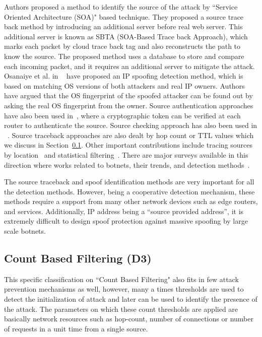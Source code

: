 \documentclass[final,5p,times,twocolumn]{elsarticle}
\begin{document}
\noindent Authors proposed a method to identify the source of the attack by ``Service Oriented Architecture (SOA)" based technique. They proposed a source trace back method by introducing an additional server before real web server. This additional server is known as SBTA (SOA-Based Trace back Approach), which marks each packet by cloud trace back tag and also reconstructs the path to know the source. The proposed method uses a database to store and compare each incoming packet, and it requires an additional server to mitigate the attack. Osanaiye et al. in ~\cite{osanaiye2015short} have proposed an IP spoofing detection method, which is based on matching OS versions of both attackers and real IP owners. Authors have argued that the OS fingerprint of the spoofed attacker can be found out by asking the real OS fingerprint from the owner. Source authentication approaches have also been used in~\cite{sourceauthentication}, where a cryptographic token can be verified at each router to authenticate the source. Source checking approach has also been used in ~\cite{multistage}. Source traceback approaches are also dealt by hop count or TTL values which we discuss in Section~\ref{thresh}. Other important contributions include tracing sources by location~\cite{luo2013preventing} and statistical filtering~\cite{law2005you}. There are major surveys available in this direction where works related to botnets, their trends, and detection methods~\cite{botnetsurveysilva}.

{The source traceback and spoof identification methods are very important for all the detection methods. However, being a cooperative detection mechanism, these methods require a support from many other network devices such as edge routers, and services. Additionally, IP address being a ``source provided address'', it is extremely difficult to design spoof protection against massive spoofing by large scale botnets. }


\subsection{Count Based Filtering (D3)}
\label{thresh}
{This specific classification on ``Count Based Filtering" also fits in few attack prevention mechanisms as well, however, many a times thresholds are used to detect the initialization of attack and later can be used to identify the presence of the attack. The parameters on which these count thresholds are applied are basically network resources such as hop-count, number of connections or number of requests in a unit time from a single source.}
\end{document}
